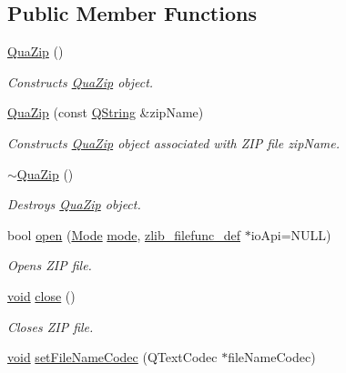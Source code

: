 \subsection*{Public Member Functions}
\begin{DoxyCompactItemize}
\item 
\hyperlink{class_qua_zip_a970e0f401c7cfd7a78e78572f758eec4}{Qua\-Zip} ()
\begin{DoxyCompactList}\small\item\em Constructs \hyperlink{class_qua_zip}{Qua\-Zip} object. \end{DoxyCompactList}\item 
\hyperlink{class_qua_zip_aaea7294b02abd22379cc3a9fccb754b7}{Qua\-Zip} (const \hyperlink{group___u_a_v_objects_plugin_gab9d252f49c333c94a72f97ce3105a32d}{Q\-String} \&zip\-Name)
\begin{DoxyCompactList}\small\item\em Constructs \hyperlink{class_qua_zip}{Qua\-Zip} object associated with Z\-I\-P file {\itshape zip\-Name}. \end{DoxyCompactList}\item 
\hyperlink{class_qua_zip_af60a2d3930b90f3b25a3148baecad81e}{$\sim$\-Qua\-Zip} ()
\begin{DoxyCompactList}\small\item\em Destroys \hyperlink{class_qua_zip}{Qua\-Zip} object. \end{DoxyCompactList}\item 
bool \hyperlink{class_qua_zip_abfa4e6018b2964a3d10a4c54e5ab3962}{open} (\hyperlink{class_qua_zip_a47e28d4116ee716fdd6b431b821d0be4}{Mode} \hyperlink{glext_8h_a1e71d9c196e4683cc06c4b54d53f7ef5}{mode}, \hyperlink{ioapi_8h_a269f2bded66a7ee4052a60025afebd7e}{zlib\-\_\-filefunc\-\_\-def} $\ast$io\-Api=N\-U\-L\-L)
\begin{DoxyCompactList}\small\item\em Opens Z\-I\-P file. \end{DoxyCompactList}\item 
\hyperlink{group___u_a_v_objects_plugin_ga444cf2ff3f0ecbe028adce838d373f5c}{void} \hyperlink{class_qua_zip_a7a4323b73e12f3b4470109f200728f9f}{close} ()
\begin{DoxyCompactList}\small\item\em Closes Z\-I\-P file. \end{DoxyCompactList}\item 
\hyperlink{group___u_a_v_objects_plugin_ga444cf2ff3f0ecbe028adce838d373f5c}{void} \hyperlink{class_qua_zip_a339010b5566704ba3c9cafbfe848d8fb}{set\-File\-Name\-Codec} (Q\-Text\-Codec $\ast$file\-Name\-Codec)

\end{DoxyCompactItemize}
